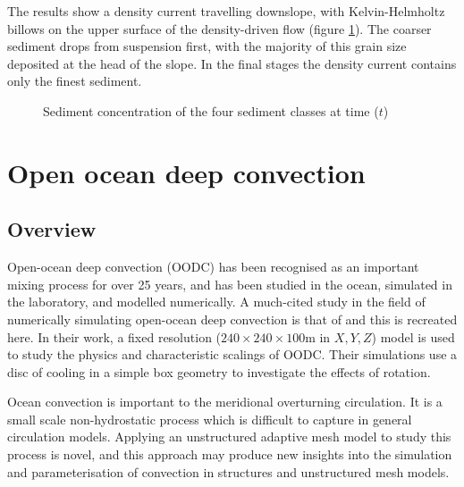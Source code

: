 The results show a density current travelling downslope, with Kelvin-Helmholtz billows
on the upper surface of the density-driven flow (figure \ref{fig:sediment_concentration}). 
The coarser sediment drops from suspension first, with the majority of this
grain size deposited at the head of the slope. In the final stages the density current contains
only the finest sediment.
\begin{figure}[ht]
  \centering
  \caption{Sediment concentration of the four sediment classes at time ($t$)}
  \label{fig:sediment_concentration}
\end{figure}





\section{Open ocean deep convection}
\label{sect:OODC}
\subsection{Overview}
Open-ocean deep convection (OODC) has been recognised as an
important mixing process for over 25 years, and
has been studied in the ocean, simulated in the laboratory, and modelled numerically.
A much-cited study in the field of numerically simulating
open-ocean deep convection is that of \cite{jones1993} and this is recreated here.
In their work, a fixed resolution ($240 \times 240 \times
100$m in $X, Y, Z$) model is used to study the physics and
characteristic scalings of OODC. Their simulations use a disc
of cooling in a simple box geometry to investigate the effects of rotation.

Ocean convection is important to the meridional overturning
circulation. It is a small scale non-hydrostatic process which
is difficult to capture in general circulation models. Applying
an unstructured adaptive mesh model to study this process is
novel, and this approach may produce new insights into the
simulation and parameterisation of convection in structures and
unstructured mesh models.


